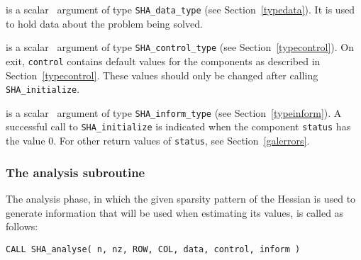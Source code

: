 \documentclass{galahad}
\newcommand{\packagename}{SHA}
\begin{document}
\vspace*{-3mm}
\begin{description}

 is a scalar \intentinout\ argument of type 
{\tt \packagename\_data\_type}
(see Section~\ref{typedata}). It is used to hold data about the problem being 
solved. 

 is a scalar \intentout\ argument of type 
{\tt \packagename\_control\_type}
(see Section~\ref{typecontrol}). 
On exit, {\tt control} contains default values for the components as
described in Section~\ref{typecontrol}.
These values should only be changed after calling 
{\tt \packagename\_initialize}.

 is a scalar \intentout\ argument of type 
{\tt \packagename\_inform\_type}
(see Section~\ref{typeinform}). A successful call to
{\tt \packagename\_initialize}
is indicated when the  component {\tt status} has the value 0. 
For other return values of {\tt status}, see Section~\ref{galerrors}.

\end{description}


\subsubsection{The analysis subroutine}
The analysis phase, in which the given sparsity pattern of the Hessian
is used to generate information that will be used when estimating 
its values, is called as follows:

\vspace*{1mm}

\hspace{8mm}
{\tt CALL \packagename\_analyse( n, nz, ROW, COL, data, control, inform )}
\end{document}
